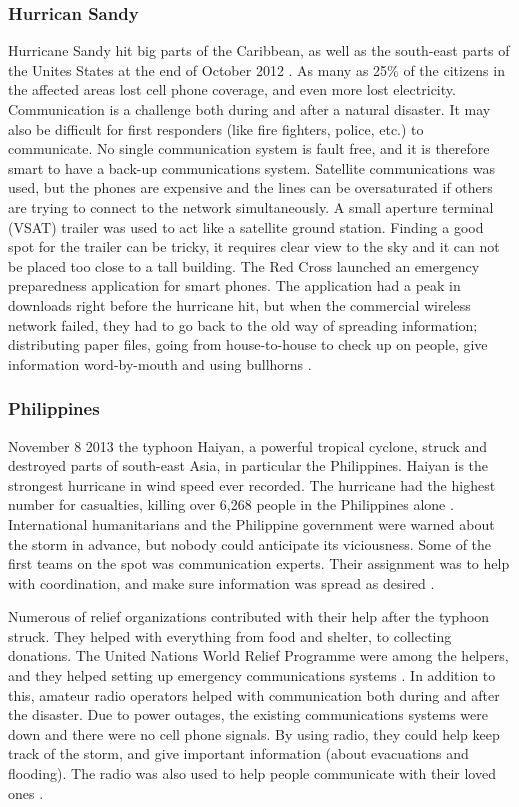 \subsubsection{Hurrican Sandy}
Hurricane Sandy hit big parts of the Caribbean, as well as the south-east parts of the Unites States at the end of October 2012 \cite{WikiSandy}. As many as 25\% of the citizens in the affected areas lost cell phone coverage, and even more lost electricity. Communication is a challenge both during and after a natural disaster. It may also be difficult for first responders (like fire fighters, police, etc.) to communicate. No single communication system is fault free, and it is therefore smart to have a back-up communications system. Satellite communications was used, but the phones are expensive and the lines can be oversaturated if others are trying to connect to the network simultaneously. A small aperture terminal (VSAT) trailer was used to act like a satellite ground station. Finding a good spot for the trailer can be tricky, it requires clear view to the sky and it can not be placed too close to a tall building. The Red Cross launched an emergency preparedness application for smart phones. The application had a peak in downloads right before the hurricane hit, but when the commercial wireless network failed, they had to go back to the old way of spreading information; distributing paper files, going from house-to-house to check up on people, give information word-by-mouth and using bullhorns \cite{hurricaneSandy}.

\subsubsection{Philippines}
November 8 2013 the typhoon Haiyan, a powerful tropical cyclone, struck and destroyed parts of south-east Asia, in particular the Philippines. Haiyan is the strongest hurricane in wind speed ever recorded. The hurricane had the highest number for casualties, killing over 6,268 people in the Philippines alone \cite{wikiHaiyan}. International humanitarians and the Philippine government were warned about the storm in advance, but nobody could anticipate its viciousness. Some of the first teams on the spot was communication experts. Their assignment was to help with coordination, and make sure information was spread as desired \cite{disasterResponse}.

Numerous of relief organizations contributed with their help after the typhoon struck. They helped with everything from food and shelter, to collecting donations. The United Nations World Relief Programme were among the helpers, and they helped setting up emergency communications systems \cite{philippines}. In addition to this, amateur radio operators helped with communication both during and after the disaster. Due to power outages, the existing communications systems were down and there were no cell phone signals. By using radio, they could help keep track of the storm, and give important information (about evacuations and flooding). The radio was also used to help people communicate with their loved ones \cite{philippinesradio}. 


